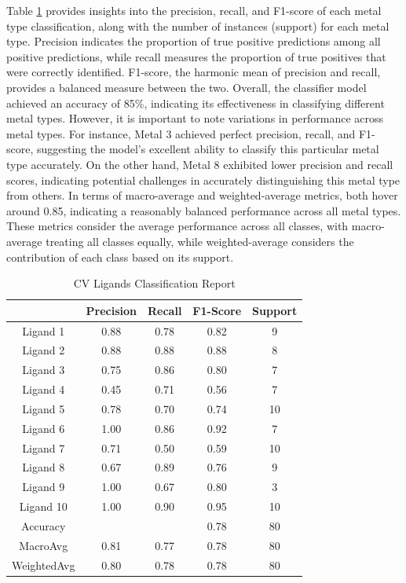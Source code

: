 Table \ref{cv_metal_report} provides insights into the precision, recall, and F1-score of each metal type classification, along with the number of instances (support) for each metal type. Precision indicates the proportion of true positive predictions among all positive predictions, while recall measures the proportion of true positives that were correctly identified. F1-score, the harmonic mean of precision and recall, provides a balanced measure between the two.
Overall, the classifier model achieved an accuracy of 85\%, indicating its effectiveness in classifying different metal types. However, it is important to note variations in performance across metal types. For instance, Metal 3 achieved perfect precision, recall, and F1-score, suggesting the model's excellent ability to classify this particular metal type accurately. On the other hand, Metal 8 exhibited lower precision and recall scores, indicating potential challenges in accurately distinguishing this metal type from others.
In terms of macro-average and weighted-average metrics, both hover around 0.85, indicating a reasonably balanced performance across all metal types. These metrics consider the average performance across all classes, with macro-average treating all classes equally, while weighted-average considers the contribution of each class based on its support.
\begin{table}[!h]
\begin{center}
\begin{tabular}{c|c|c|c|c}
 & Precision & Recall & F1-Score & Support\\
\hline
Ligand 1 & 0.88 & 0.78 & 0.82 & 9\\
Ligand 2 & 0.88 & 0.88 & 0.88 & 8\\
Ligand 3 & 0.75 & 0.86 & 0.80 & 7\\
Ligand 4 & 0.45 & 0.71 & 0.56 & 7\\
Ligand 5 & 0.78 & 0.70 & 0.74 & 10\\
Ligand 6 & 1.00 & 0.86 & 0.92 & 7\\
Ligand 7 & 0.71 & 0.50 & 0.59 & 10\\
Ligand 8 & 0.67 & 0.89 & 0.76 & 9\\
Ligand 9 & 1.00 & 0.67 & 0.80 & 3\\
Ligand 10 & 1.00 & 0.90 & 0.95 & 10\\
\hline
Accuracy & & & 0.78 & 80\\
MacroAvg & 0.81 & 0.77 & 0.78 & 80\\
WeightedAvg & 0.80 & 0.78 & 0.78 & 80
\end{tabular}
\caption{CV Ligands Classification Report}
\label{cv_metal_report}
\end{center}
\end{table}
